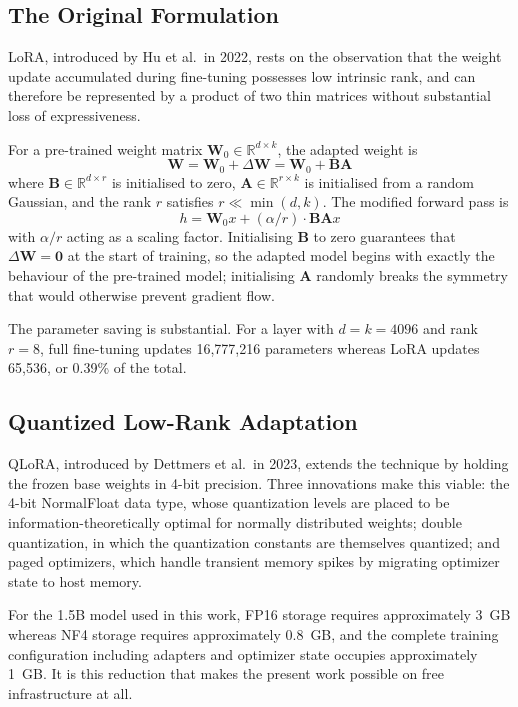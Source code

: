\documentclass[12pt,a4paper]{report}
\begin{document}
\subsection{The Original Formulation}

LoRA, introduced by Hu et al.~in 2022, rests on the observation that the weight update accumulated during fine-tuning possesses low intrinsic rank, and can therefore be represented by a product of two thin matrices without substantial loss of expressiveness.

For a pre-trained weight matrix $\mathbf{W}_0 \in \mathbb{R}^{d \times k}$, the adapted weight is
\begin{equation}
\mathbf{W} = \mathbf{W}_0 + \Delta\mathbf{W} = \mathbf{W}_0 + \mathbf{BA}
\end{equation}
where $\mathbf{B} \in \mathbb{R}^{d \times r}$ is initialised to zero, $\mathbf{A} \in \mathbb{R}^{r \times k}$ is initialised from a random Gaussian, and the rank $r$ satisfies $r \ll \min(d, k)$. The modified forward pass is
\begin{equation}
h = \mathbf{W}_0 x + (\alpha/r) \cdot \mathbf{BA}x
\end{equation}
with $\alpha/r$ acting as a scaling factor. Initialising $\mathbf{B}$ to zero guarantees that $\Delta\mathbf{W} = \mathbf{0}$ at the start of training, so the adapted model begins with exactly the behaviour of the pre-trained model; initialising $\mathbf{A}$ randomly breaks the symmetry that would otherwise prevent gradient flow.

The parameter saving is substantial. For a layer with $d = k = 4096$ and rank $r = 8$, full fine-tuning updates 16,777,216 parameters whereas LoRA updates 65,536, or 0.39\% of the total.

\subsection{Quantized Low-Rank Adaptation}

QLoRA, introduced by Dettmers et al.~in 2023, extends the technique by holding the frozen base weights in 4-bit precision. Three innovations make this viable: the 4-bit NormalFloat data type, whose quantization levels are placed to be information-theoretically optimal for normally distributed weights; double quantization, in which the quantization constants are themselves quantized; and paged optimizers, which handle transient memory spikes by migrating optimizer state to host memory.

For the 1.5B model used in this work, FP16 storage requires approximately 3~GB whereas NF4 storage requires approximately 0.8~GB, and the complete training configuration including adapters and optimizer state occupies approximately 1~GB. It is this reduction that makes the present work possible on free infrastructure at all.
\end{document}
